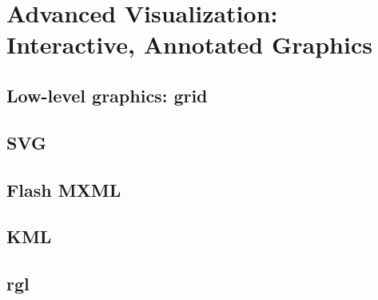 \documentclass[11pt]{book}
\begin{document}
\chapter{Advanced Visualization: Interactive, Annotated Graphics}

\section{Low-level graphics: grid}

\section{SVG}
\section{Flash MXML}
\section{KML}

\section{rgl}
\end{document}
